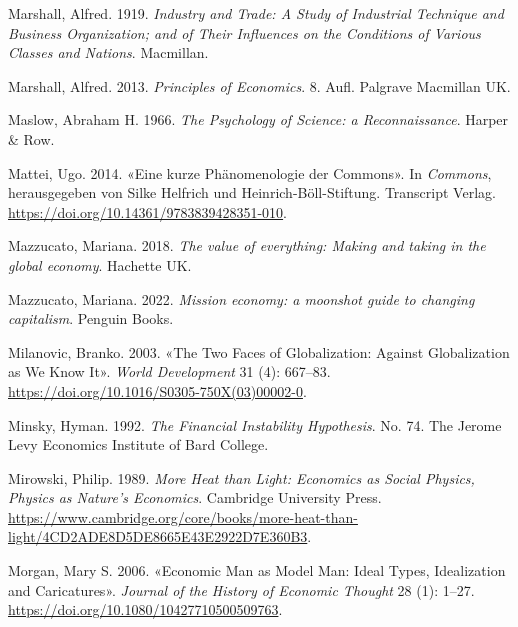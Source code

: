 \documentclass[
  nswissgerman,
  a4paper,
  DIV=11,
  numbers=noendperiod,
  oneside,
  openany]{scrreprt}
\newlength{\cslhangindent}
\newenvironment{CSLReferences}[2] %
 {\begin{list}{}{%
  \setlength{\itemindent}{0pt}
  \setlength{\leftmargin}{0pt}
  \setlength{\parsep}{0pt}
  \ifodd #1
   \setlength{\leftmargin}{\cslhangindent}
   \setlength{\itemindent}{-1\cslhangindent}
  \fi
  \setlength{\itemsep}{#2\baselineskip}}}
 {\end{list}}
\begin{document}
\begin{CSLReferences}{1}{1}
Marshall, Alfred. 1919. \emph{Industry and Trade: A Study of Industrial
Technique and Business Organization; and of Their Influences on the
Conditions of Various Classes and Nations}. Macmillan.

Marshall, Alfred. 2013. \emph{Principles of Economics}. 8. Aufl.
Palgrave Macmillan UK.

Maslow, Abraham H. 1966. \emph{The Psychology of Science: a
Reconnaissance}. Harper \& Row.

Mattei, Ugo. 2014. {«Eine kurze {Phänomenologie} der {Commons}»}. In
\emph{Commons}, herausgegeben von Silke Helfrich und
Heinrich-Böll-Stiftung. Transcript Verlag.
\url{https://doi.org/10.14361/9783839428351-010}.

Mazzucato, Mariana. 2018. \emph{The value of everything: Making and
taking in the global economy}. Hachette UK.

Mazzucato, Mariana. 2022. \emph{Mission economy: a moonshot guide to
changing capitalism}. Penguin Books.

Milanovic, Branko. 2003. {«The Two Faces of Globalization: Against
Globalization as We Know It»}. \emph{World Development} 31 (4): 667--83.
\url{https://doi.org/10.1016/S0305-750X(03)00002-0}.

Minsky, Hyman. 1992. \emph{The Financial Instability Hypothesis}. No.
74. The Jerome Levy Economics Institute of Bard College.

Mirowski, Philip. 1989. \emph{More Heat than Light: Economics as Social
Physics, Physics as Nature's Economics}. Cambridge University Press.
\url{https://www.cambridge.org/core/books/more-heat-than-light/4CD2ADE8D5DE8665E43E2922D7E360B3}.

Morgan, Mary S. 2006. {«Economic Man as Model Man: Ideal Types,
Idealization and Caricatures»}. \emph{Journal of the History of Economic
Thought} 28 (1): 1--27. \url{https://doi.org/10.1080/10427710500509763}.


\end{CSLReferences}
\end{document}
